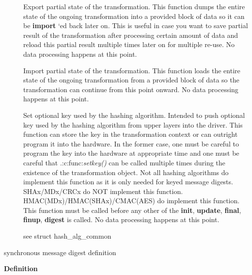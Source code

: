 \documentclass[a4paper,8pt,english]{sphinxmanual}
\begin{document}
\begin{description}
\item[{}] \leavevmode
Export partial state of the transformation. This function dumps the
entire state of the ongoing transformation into a provided block of
data so it can be \textbf{import} `ed back later on. This is useful in case
you want to save partial result of the transformation after
processing certain amount of data and reload this partial result
multiple times later on for multiple re-use. No data processing
happens at this point.

\item[{}] \leavevmode
Import partial state of the transformation. This function loads the
entire state of the ongoing transformation from a provided block of
data so the transformation can continue from this point onward. No
data processing happens at this point.

\item[{}] \leavevmode
Set optional key used by the hashing algorithm. Intended to push
optional key used by the hashing algorithm from upper layers into
the driver. This function can store the key in the transformation
context or can outright program it into the hardware. In the former
case, one must be careful to program the key into the hardware at
appropriate time and one must be careful that .:c:func:\emph{setkey()} can be
called multiple times during the existence of the transformation
object. Not  all hashing algorithms do implement this function as it
is only needed for keyed message digests. SHAx/MDx/CRCx do NOT
implement this function. HMAC(MDx)/HMAC(SHAx)/CMAC(AES) do implement
this function. This function must be called before any other of the
\textbf{init}, \textbf{update}, \textbf{final}, \textbf{finup}, \textbf{digest} is called. No data
processing happens at this point.

\item[{}] \leavevmode
see struct hash\_alg\_common

\end{description}

\begin{fulllineitems}
\label{crypto/api-digest:c.shash_alg}
synchronous message digest definition

\end{fulllineitems}


\textbf{Definition}
\end{document}
